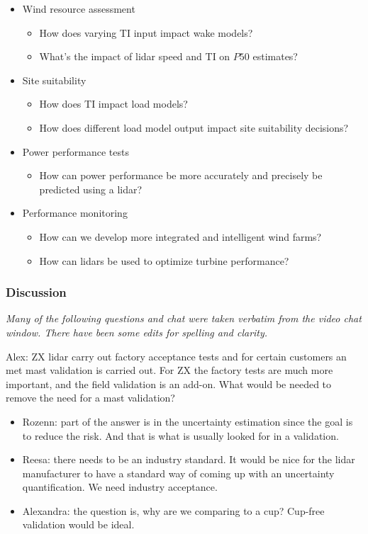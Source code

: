 \begin{itemize}
    \item Wind resource assessment
    \begin{itemize}
        \item How does varying TI input impact wake models?
        \item What's the impact of lidar speed and TI on $P\textrm{50}$ estimates?
    \end{itemize}
    \item Site suitability 
    \begin{itemize}
        \item How does TI impact load models?
        \item How does different load model output impact site suitability decisions?
    \end{itemize}
    \item Power performance tests
    \begin{itemize}
        \item How can power performance be more accurately and precisely be predicted using a lidar?
    \end{itemize}
    \item Performance monitoring
    \begin{itemize}
        \item How can we develop more integrated and intelligent wind farms?
        \item How can lidars be used to optimize turbine performance?
    \end{itemize}
\end{itemize}

\subsubsection{Discussion}
\emph{Many of the following questions and chat were taken verbatim from the video chat window. There have been some edits for spelling and clarity.}

Alex: ZX lidar carry out factory acceptance tests and for certain customers an met mast validation is carried out. For ZX the factory tests are much more important, and the field validation is an add-on. What would be needed to remove the need for a mast validation?
\begin{itemize}
    \item Rozenn: part of the answer is in the uncertainty estimation since the goal is to reduce the risk. And that is what is usually looked for in a validation. 
    \item Reesa: there needs to be an industry standard. It would be nice for the lidar manufacturer to have a standard way of coming up with an uncertainty quantification. We need industry acceptance. 
    \item Alexandra: the question is, why are we comparing to a cup? Cup-free validation would be ideal.
\end{itemize}

